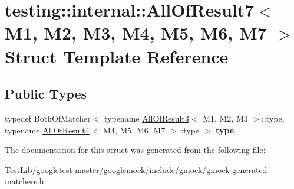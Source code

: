 \hypertarget{structtesting_1_1internal_1_1AllOfResult7}{}\section{testing\+:\+:internal\+:\+:All\+Of\+Result7$<$ M1, M2, M3, M4, M5, M6, M7 $>$ Struct Template Reference}
\label{structtesting_1_1internal_1_1AllOfResult7}
\subsection*{Public Types}
\begin{DoxyCompactItemize}
\item 
\mbox{\label{structtesting_1_1internal_1_1AllOfResult7_a47ab0d670258434b0e65530591948e8c}} 
typedef Both\+Of\+Matcher$<$ typename \hyperlink{structtesting_1_1internal_1_1AllOfResult3}{All\+Of\+Result3}$<$ M1, M2, M3 $>$\+::type, typename \hyperlink{structtesting_1_1internal_1_1AllOfResult4}{All\+Of\+Result4}$<$ M4, M5, M6, M7 $>$\+::type $>$ {\bfseries type}
\end{DoxyCompactItemize}


The documentation for this struct was generated from the following file\+:\begin{DoxyCompactItemize}
\item 
Test\+Lib/googletest-\/master/googlemock/include/gmock/gmock-\/generated-\/matchers.\+h\end{DoxyCompactItemize}
